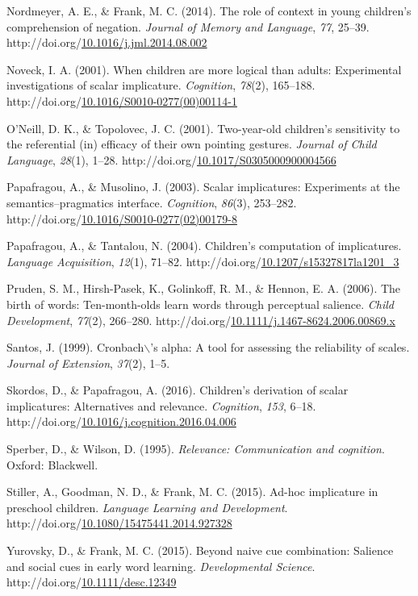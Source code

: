 \documentclass[a4paper,man,apacite,floatsintext]{apa6}
\begin{document}
Nordmeyer, A. E., \& Frank, M. C. (2014). The role of context in young
children's comprehension of negation. \emph{Journal of Memory and
Language}, \emph{77}, 25--39.
http://doi.org/\href{http://dx.doi.org/10.1016/j.jml.2014.08.002}{10.1016/j.jml.2014.08.002}

Noveck, I. A. (2001). When children are more logical than adults:
Experimental investigations of scalar implicature. \emph{Cognition},
\emph{78}(2), 165--188.
http://doi.org/\href{http://dx.doi.org/10.1016/S0010-0277(00)00114-1}{10.1016/S0010-0277(00)00114-1}

O'Neill, D. K., \& Topolovec, J. C. (2001). Two-year-old children's
sensitivity to the referential (in) efficacy of their own pointing
gestures. \emph{Journal of Child Language}, \emph{28}(1), 1--28.
http://doi.org/\href{http://dx.doi.org/10.1017/S0305000900004566}{10.1017/S0305000900004566}

Papafragou, A., \& Musolino, J. (2003). Scalar implicatures: Experiments
at the semantics--pragmatics interface. \emph{Cognition}, \emph{86}(3),
253--282.
http://doi.org/\href{http://dx.doi.org/10.1016/S0010-0277(02)00179-8}{10.1016/S0010-0277(02)00179-8}

Papafragou, A., \& Tantalou, N. (2004). Children's computation of
implicatures. \emph{Language Acquisition}, \emph{12}(1), 71--82.
http://doi.org/\href{http://dx.doi.org/10.1207/s15327817la1201_3}{10.1207/s15327817la1201\_3}

Pruden, S. M., Hirsh-Pasek, K., Golinkoff, R. M., \& Hennon, E. A.
(2006). The birth of words: Ten-month-olds learn words through
perceptual salience. \emph{Child Development}, \emph{77}(2), 266--280.
http://doi.org/\href{http://dx.doi.org/10.1111/j.1467-8624.2006.00869.x}{10.1111/j.1467-8624.2006.00869.x}

Santos, J. (1999). Cronbach\(\backslash\)'s alpha: A tool for assessing
the reliability of scales. \emph{Journal of Extension}, \emph{37}(2),
1--5.

Skordos, D., \& Papafragou, A. (2016). Children's derivation of scalar
implicatures: Alternatives and relevance. \emph{Cognition}, \emph{153},
6--18.
http://doi.org/\href{http://dx.doi.org/10.1016/j.cognition.2016.04.006}{10.1016/j.cognition.2016.04.006}

Sperber, D., \& Wilson, D. (1995). \emph{Relevance: Communication and
cognition}. Oxford: Blackwell.

Stiller, A., Goodman, N. D., \& Frank, M. C. (2015). Ad-hoc implicature
in preschool children. \emph{Language Learning and Development}.
http://doi.org/\href{http://dx.doi.org/10.1080/15475441.2014.927328}{10.1080/15475441.2014.927328}

Yurovsky, D., \& Frank, M. C. (2015). Beyond naive cue combination:
Salience and social cues in early word learning. \emph{Developmental
Science}.
http://doi.org/\href{http://dx.doi.org/10.1111/desc.12349}{10.1111/desc.12349}


\end{document}
